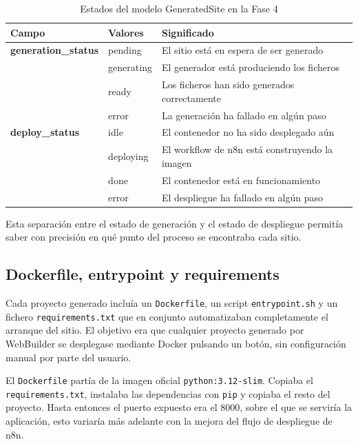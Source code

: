 \begin{table}[H]
    \centering
    \begin{tabular}{|l|l|p{7cm}|}
        \hline
        \textbf{Campo} & \textbf{Valores} & \textbf{Significado} \\
        \hline
        \textbf{generation\_status} & pending & El sitio está en espera de ser generado \\
        \hline
        & generating & El generador está produciendo los ficheros \\
        \hline
        & ready & Los ficheros han sido generados correctamente \\
        \hline
        & error & La generación ha fallado en algún paso \\
        \hline
        \textbf{deploy\_status} & idle & El contenedor no ha sido desplegado aún \\
        \hline
        & deploying & El workflow de n8n está construyendo la imagen \\
        \hline
        & done & El contenedor está en funcionamiento \\
        \hline
        & error & El despliegue ha fallado en algún paso \\
        \hline
    \end{tabular}
    \caption{Estados del modelo GeneratedSite en la Fase 4}
    \label{tab:estados-generatedsite}
\end{table}

Esta separación entre el estado de generación y el estado de despliegue 
permitía saber con precisión en qué punto del proceso se encontraba cada sitio.

\subsection{Dockerfile, entrypoint y requirements}
\label{subsec:dockerfile}

Cada proyecto generado incluía un \texttt{Dockerfile}, un script \texttt{entrypoint.sh} y un fichero \texttt{requirements.txt} que en conjunto automatizaban completamente el arranque del sitio. El objetivo era que cualquier proyecto generado por WebBuilder se desplegase mediante Docker pulsando un botón, sin configuración manual por parte del usuario.

El \texttt{Dockerfile} partía de la imagen oficial \texttt{python:3.12-slim}. Copiaba el \\ \texttt{requirements.txt}, instalaba las dependencias con \texttt{pip} y copiaba el resto del proyecto. Hasta entonces el puerto expuesto era el 8000, sobre el que se serviría la aplicación, esto variaría más adelante con la mejora del flujo de despliegue de n8n.

